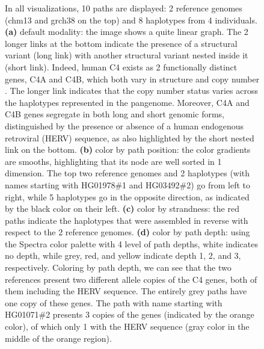 \begin{figure}[h!]
{        In all visualizations, 10 paths are displayed: 2 reference genomes (chm13 and grch38 on the top) and 8 haplotypes from 4 individuals.
        \textbf{(a)} default modality: the image shows a quite linear graph.
        The 2 longer links at the bottom indicate the presence of a structural variant (long link) with another structural variant nested inside it (short link).
        Indeed, human C4 exists as 2 functionally distinct genes, C4A and C4B, which both vary in structure and copy number \citep{Sekar_2016}. The longer link indicates that the copy number status varies across the haplotypes represented in the pangenome.
        Moreover, C4A and C4B genes segregate in both long and short genomic forms, distinguished by the presence or absence of a human endogenous retroviral (HERV) sequence, as also highlighted by the short nested link on the bottom.
        \textbf{(b)} color by path position: the color gradients are smooths, highlighting that its node are well sorted in 1 dimension.
        The top two reference genomes and 2 haplotypes (with names starting with HG01978\#1 and HG03492\#2) go from left to right, while 5 haplotypes go in the opposite direction, as indicated by the black color on their left.
        \textbf{(c)} color by strandness: the red paths indicate the haplotypes that were assembled in reverse with respect to the 2 reference genomes.
        \textbf{(d)} color by path depth: using the Spectra color palette with 4 level of path depths, white indicates no depth, while grey, red, and yellow indicate depth 1, 2, and 3, respectively.
        Coloring by path depth, we can see that the two references present two different allele copies of the C4 genes, both of them including the HERV sequence. The entirely grey paths have one copy of these genes.
        The path with name starting with HG01071\#2 presents 3 copies of the genes (indicated by the orange color), of which only 1 with the HERV sequence (gray color in the middle of the orange region).
    }
    \label{fig:odgi_viz}
\end{figure}
